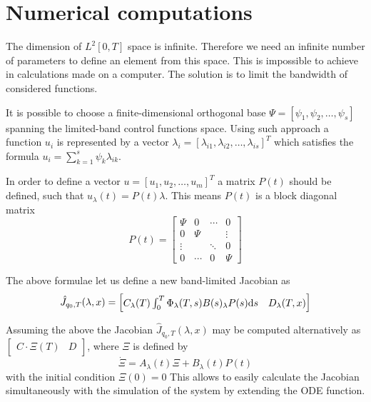 \section{Numerical computations}
The dimension of $L^2[0,T]$ space is infinite. Therefore we need an infinite number of parameters to define an element from this space. This is impossible to achieve in calculations made on a computer. The solution is to limit the bandwidth of considered functions. 

It is possible to choose a finite-dimensional orthogonal base $\Psi = [ \psi_1, \psi_2, \dots, \psi_s ]$ spanning the limited-band control functions space. 
Using such approach a function $u_i$ is represented by a vector 
$\lambda_i = [\lambda_{i1}, \lambda_{i2}, \dots, \lambda_{is}]^T$ 
which satisfies the formula $u_i = \sum_{k=1}^s \psi_k \lambda_{ik}$.

In order to define a vector $u=[u_1, u_2, \dots, u_m]^T$ a matrix $P(t)$ should be defined, such that $u_\lambda(t)=P(t)\lambda$. This means $P(t)$ is a block diagonal matrix 
\begin{equation}
P(t)=\begin{bmatrix}
\Psi & 0 & \cdots & 0\\
0 & \Psi &  & \vdots\\
\vdots &  & \ddots & 0 \\
0 &  \cdots & 0 & \Psi
\end{bmatrix}
\end{equation}

The above formulae let us define a new band-limited Jacobian as
\begin{equation}
\hat J_{q_0, T}(\lambda, x)=\begin{bmatrix}C_\lambda(T)\int_0^T \Phi_\lambda(T,s)B(s)_\lambda P(s)\mathrm{d} s & D_\lambda(T,x)\end{bmatrix}
\end{equation}

Assuming the above the Jacobian $\hat J_{q_0, T}(\lambda, x)$
may be computed alternatively as\\ $\begin{bmatrix}
C\cdot\Xi(T)& D
\end{bmatrix}$, where $\Xi$ is defined by  
\begin{equation}
\dot \Xi = A_\lambda(t)\Xi +B_\lambda(t)P(t)
\end{equation}
with the initial condition $\Xi(0)=0$ %
This allows to easily calculate the Jacobian simultaneously with the simulation
of the system by extending the ODE function.

